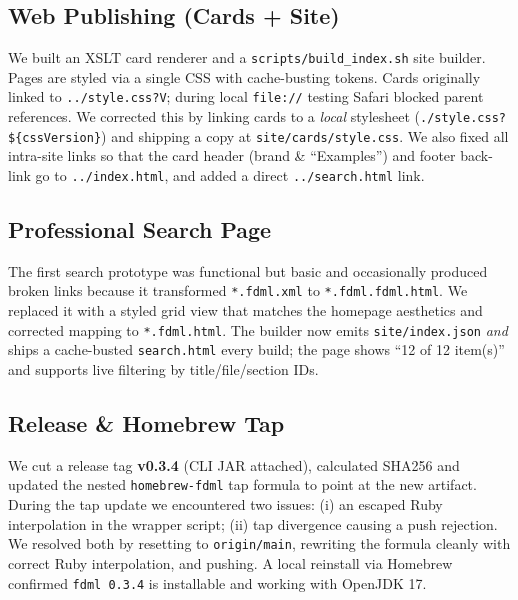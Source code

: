 \documentclass[11pt,a4paper]{article}
\newcommand{\code}[1]{\texttt{#1}}
\begin{document}
\subsection{Web Publishing (Cards + Site)}
We built an XSLT card renderer and a \code{scripts/build\_index.sh} site builder. Pages are styled via a single CSS with cache-busting tokens. Cards originally linked to \code{../style.css?V}; during local \code{file://} testing Safari blocked parent references. We corrected this by linking cards to a \emph{local} stylesheet (\code{./style.css?\$\{cssVersion\}}) and shipping a copy at \code{site/cards/style.css}. We also fixed all intra-site links so that the card header (brand \& ``Examples'') and footer back-link go to \code{../index.html}, and added a direct \code{../search.html} link.

\subsection{Professional Search Page}
The first search prototype was functional but basic and occasionally produced broken links because it transformed \code{*.fdml.xml} to \code{*.fdml.fdml.html}. We replaced it with a styled grid view that matches the homepage aesthetics and corrected mapping to \code{*.fdml.html}. The builder now emits \code{site/index.json} \emph{and} ships a cache-busted \code{search.html} every build; the page shows ``12 of 12 item(s)'' and supports live filtering by title/file/section IDs.

\subsection{Release \& Homebrew Tap}
We cut a release tag \textbf{v0.3.4} (CLI JAR attached), calculated SHA256 and updated the nested \code{homebrew-fdml} tap formula to point at the new artifact. During the tap update we encountered two issues: (i) an escaped Ruby interpolation in the wrapper script; (ii) tap divergence causing a push rejection. We resolved both by resetting to \code{origin/main}, rewriting the formula cleanly with correct Ruby interpolation, and pushing. A local reinstall via Homebrew confirmed \code{fdml 0.3.4} is installable and working with OpenJDK 17.
\end{document}
